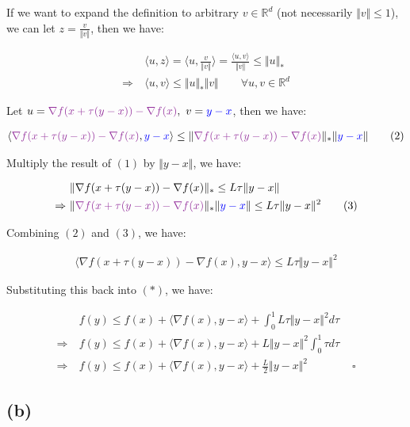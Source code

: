 \documentclass{article}
\begin{document}
If we want to expand the definition to arbitrary $v \in \mathbb{R}^d$ (not necessarily $\Vert v \Vert \leq 1$), 
we can let $z = \frac{v}{\Vert v \Vert}$, then we have:

\begin{align*}
    &\langle u, z \rangle = \langle u, \frac{v}{\Vert v \Vert} \rangle = \frac{\langle u, v \rangle}{\Vert v \Vert} \leq \Vert u \Vert_* \\
    \Rightarrow \ &\langle u, v \rangle \leq \Vert u \Vert_* \Vert v \Vert \qquad \forall u, v \in \mathbb{R}^d
\end{align*}

Let $u = \textcolor{Purple}{\nabla f ( x + \tau ( y - x ) ) - \nabla f ( x )}, \ v = \textcolor{blue}{y - x}$, then we have:

\begin{align*}
    \langle \textcolor{Purple}{\nabla f ( x + \tau ( y - x ) ) - \nabla f ( x )}, \textcolor{blue}{y - x} \rangle \leq \Vert \textcolor{Purple}{\nabla f ( x + \tau ( y - x ) ) - \nabla f ( x )} \Vert_* \Vert \textcolor{blue}{y - x} \Vert \tag{2}
\end{align*}

Multiply the result of $(1)$ by $\Vert y - x \Vert$, we have:

\begin{align*}
    &\Vert \nabla f ( x + \tau ( y - x ) ) - \nabla f ( x ) \Vert_* \leq L \tau \Vert y - x \Vert \\
    \Rightarrow \ &\Vert \textcolor{Purple}{\nabla f ( x + \tau ( y - x ) ) - \nabla f ( x )} \Vert_* \Vert \textcolor{blue}{y - x} \Vert \leq L \tau \Vert y - x \Vert^2 \tag{3}
\end{align*}

Combining $(2)$ and $(3)$, we have:

\begin{align*}
    \langle \nabla f ( x + \tau ( y - x ) ) - \nabla f ( x ), y - x \rangle \leq L \tau \Vert y - x \Vert^2
\end{align*}

Substituting this back into $(*)$, we have:

\begin{align*}
    &f(y) \leq f(x) + \langle \nabla f (x), y - x \rangle + \int_0^1 L \tau \Vert y - x \Vert^2 d\tau \\
    \Rightarrow \ &f(y) \leq f(x) + \langle \nabla f (x), y - x \rangle + L \Vert y - x \Vert^2 \int_0^1 \tau d\tau \\
    \Rightarrow \ &f(y) \leq f(x) + \langle \nabla f (x), y - x \rangle + \frac{L}{2} \Vert y - x \Vert^2 \qquad \qquad \square
\end{align*}




\subsection*{(b)}
\end{document}
